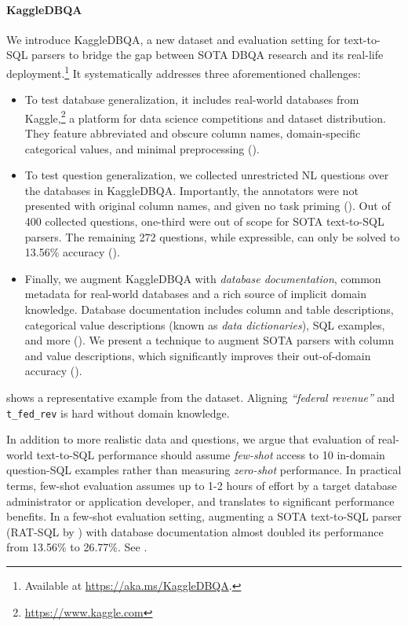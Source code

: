 \documentclass[11pt,a4paper]{article}
\newcommand{\systemname}{\mbox{KaggleDBQA}\xspace}
\newcommand{\sql}[1]{\lstinline[language=SQL, basicstyle=\footnotesize\ttfamily]{#1}}
\begin{document}
\paragraph{\systemname}
We introduce \systemname, a new dataset and evaluation setting for text-to-SQL parsers to bridge the gap between SOTA
DBQA research and its real-life deployment.\footnote{Available at \url{https://aka.ms/KaggleDBQA}.}
It systematically addresses three aforementioned challenges:
\begin{itemize}[left=0pt]
    \item To test database generalization, it includes real-world databases from
        Kaggle,\footnote{\url{https://www.kaggle.com}} a platform for data science competitions and dataset
        distribution.
        They feature abbreviated and obscure column names, domain-specific categorical values, and minimal
        preprocessing ().
    \item To test question generalization, we collected unrestricted NL questions over the databases in \systemname.
        Importantly, the annotators were not presented with original column names, and given no task priming
        ().
        Out of 400 collected questions, one-third were out of scope for SOTA text-to-SQL parsers.
        The remaining 272 questions, while expressible, can only be solved to 13.56\% accuracy ().
    \item Finally, we augment \systemname with \emph{database documentation}, common metadata for real-world 
        databases and a rich source of implicit domain knowledge.
        Database documentation includes column and table descriptions, categorical value descriptions (known as
        \emph{data dictionaries}), SQL examples, and more ().
        We present a technique to augment SOTA parsers with column and value descriptions, which significantly improves their
        out-of-domain accuracy ().
\end{itemize}
 shows a representative example from the dataset.
Aligning \emph{``federal revenue''} and \sql{t_fed_rev} is hard without domain knowledge.

In addition to more realistic data and questions, we argue that evaluation of real-world text-to-SQL performance should
assume \emph{few-shot} access to 10 in-domain question-SQL examples rather than measuring \emph{zero-shot} performance.
In practical terms, few-shot evaluation assumes up to 1-2 hours of effort by a target database administrator or
application developer, and translates to significant performance benefits.
In a few-shot evaluation setting, augmenting a SOTA text-to-SQL parser (RAT-SQL by \citet{wang-etal-2020-rat}) with
database documentation almost doubled its performance from 13.56\% to 26.77\%.
See .
\end{document}
